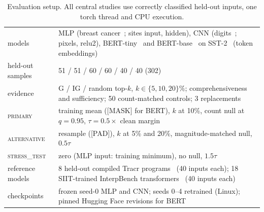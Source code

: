 \begin{table}[t]
\centering
\caption{Evaluation setup. All central studies use correctly classified held-out inputs, one torch thread and CPU execution.}
\label{tab:setup}
\setlength{\tabcolsep}{2.5pt}
\footnotesize
\begin{tabular}{p{}p{}}
\toprule
models & MLP (breast cancer~\cite{wolberg1993breast}; sites input, hidden), CNN (digits~\cite{alpaydin1998digits}; pixels, relu2), BERT-tiny~\cite{turc2019wellread,frantar2021mfac} and BERT-base~\cite{devlin2019bert,morris2020textattack} on SST-2~\cite{socher2013sst,wang2018glue} (token embeddings) \\
held-out samples & 51 / 51 / 60 / 60 / 40 / 40 (302) \\
evidence & G / IG / random top-$k$, $k\in\{5,10,20\}\%$; comprehensiveness and sufficiency; 50 count-matched controls; 3 replacements \\
\textsc{primary} & training mean ([MASK] for BERT), $k$ at 10\%, count null at $q=0.95$, $\tau=0.5\times$ clean margin \\
\textsc{alternative} & resample ([PAD]), $k$ at 5\% and 20\%, magnitude-matched null, $0.5\tau$ \\
\textsc{stress\_test} & zero (MLP input: training minimum), no null, $1.5\tau$ \\
reference models & 8 held-out compiled Tracr programs~\cite{lindner2023tracr} (40 inputs each); 18 SIIT-trained InterpBench transformers~\cite{gupta2024interpbench} (40 inputs each) \\
checkpoints & frozen seed-0 MLP and CNN; seeds 0--4 retrained (Linux); pinned Hugging Face revisions for BERT \\
\bottomrule
\end{tabular}
\end{table}
